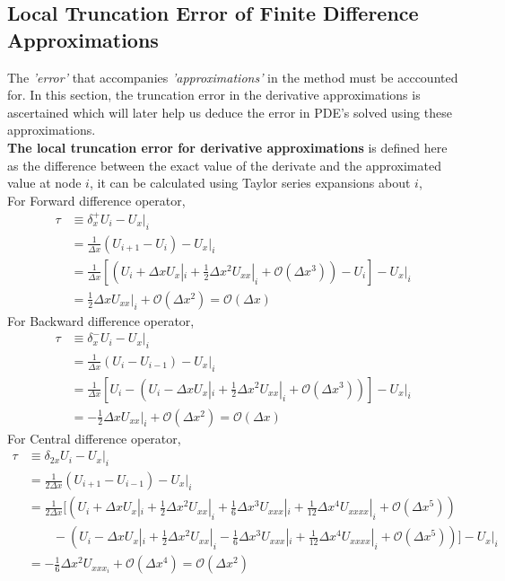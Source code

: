 \documentclass[a4paper,12pt]{article}
\numberwithin{equation}{section}
\newcommand{\mcm}[1]{\mathcal{#1}}
\newcommand{\sDelta}{{\scriptstyle \Delta}}
\begin{document}
\subsection{Local Truncation Error of Finite Difference Approximations}
The \textit{'error'} that accompanies \textit{'approximations'} in the method must be acccounted for. In this section, the truncation error in the derivative approximations is ascertained which will later help us deduce the error in PDE's solved using these approximations.
\\[2mm]
\textbf{The local truncation error for derivative approximations} is defined here as the difference between the exact value of the derivate and the approximated value at node $i$, it can be calculated using Taylor series expansions about $i$,\\[2mm]
For Forward difference operator, 
\begin{align*}
    \tau &\equiv \delta _ x^{+} U_ i - {U_ x}|_ i \\
    &= \frac{1}{\sDelta x}\left( U_ {i+1} - U_{i}\right) - {U_ x}|_i \\
    &= \frac{1}{\sDelta x}\left[ \left( U_ i + \sDelta x{U_ x}|_ i + \frac{1}{2}\sDelta x^2{U_{xx}}|_ i + \mcm{O}(\sDelta x^3)\right) - U_i \right] - {U_ x}|_ i \\
    &= \frac{1}{2}\sDelta x{U_{xx}}|_ i + \mcm{O}(\sDelta x^2) = \mcm{O}(\Delta x)
\end{align*}
For Backward difference operator, 
\begin{align*}
    \tau &\equiv \delta _ x^{-} U_ i - {U_ x}|_ i \\
    &= \frac{1}{\sDelta x}\left( U_ i - U_{i-1}\right) - {U_ x}|_i \\
    &= \frac{1}{\sDelta x}\left[ U_ i - \left( U_ i - \sDelta x{U_ x}|_ i + \frac{1}{2}\sDelta x^2{U_{xx}}|_ i + \mcm{O}(\sDelta x^3)\right)\right] - {U_ x}|_ i \\
    &= -\frac{1}{2}\sDelta x{U_{xx}}|_ i + \mcm{O}(\sDelta x^2) = \mcm{O}(\Delta x)  
\end{align*}
For Central difference operator,
\begin{align*}
    \tau &\equiv \delta _ {2x} U_ i - {U_ x}|_ i \\
    &= \frac{1}{{2 \sDelta } x}\left( U_ {i+1} - U_{i-1}\right) - {U_ x}|_i \\
    &= \frac{1}{2 \sDelta  x}\Bigg[ \left( U_ i + \sDelta x{U_ x}|_ i + \frac{1}{2}\sDelta x^2{U_{xx}}|_ i + \frac{1}{6}\sDelta x^3{U_{xxx}}|_ i + \frac{1}{12}\sDelta x^4{U_{xxxx}}|_ i + \mcm{O}(\sDelta x^5)\right) \\
    &\qquad - \left( U_ i - \sDelta x{U_ x}|_ i + \frac{1}{2}\sDelta x^2{U_{xx}}|_ i - \frac{1}{6}\sDelta x^3{U_{xxx}}|_ i + \frac{1}{12}\sDelta x^4{U_{xxxx}}|_ i +\mcm{O}(\sDelta x^5)\right)\Bigg] - {U_ x}|_ i \\
    &= -\frac{1}{6}\Delta x^2 U_{xxx_ i} + \mcm{O}(\Delta x^4) = \mcm{O}(\Delta x^2)
\end{align*}
\end{document}
